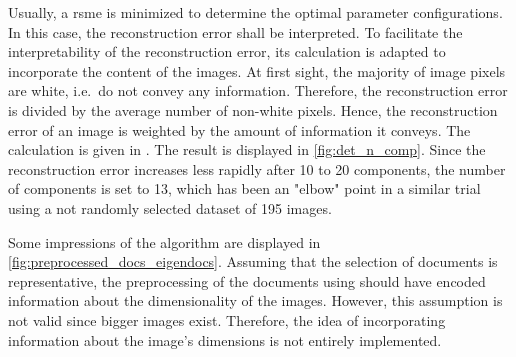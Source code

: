 Usually, a \ac{rsme} is minimized to determine the optimal parameter configurations.
In this case, the reconstruction error shall be interpreted.
To facilitate the interpretability of the reconstruction error, its calculation is adapted to incorporate the content of the images.
At first sight, the majority of image pixels are white, i.e.\ do not convey any information.
Therefore, the reconstruction error is divided by the average number of non-white pixels. 
Hence, the reconstruction error of an image is weighted by the amount of information it conveys.
The calculation is given in .
The result is displayed in \autoref{fig:det_n_comp}.
Since the reconstruction error increases less rapidly after 10 to 20 components, the number of components is set to 13,
which has been an "elbow" point in a similar trial using a not randomly selected dataset of 195 images.


Some impressions of the \eigendocs{} algorithm are displayed in \autoref{fig:preprocessed_docs_eigendocs}.
Assuming that the selection of documents is representative, 
the preprocessing of the documents using \eigendocs{} should have encoded information about the dimensionality of the images.
However, this assumption is not valid since bigger images exist.
Therefore, the idea of incorporating information about the image's dimensions is not entirely implemented.